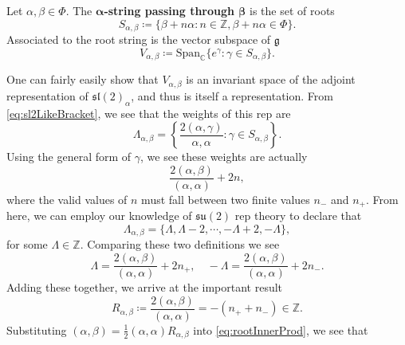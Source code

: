 \documentclass[11pt,fleqn]{article}
\begin{document}
\begin{definition}
	Let $\alpha, \beta \in \Phi$. The \textbf{$\boldsymbol{\alpha}$-string passing through $\boldsymbol{\beta}$} is the set of roots
		\begin{equation}
			S_{\alpha,\beta} \coloneqq \{ \beta + n \alpha: n \in \mathbb{Z}, \beta + n \alpha \in \Phi \}.
		\end{equation}
	Associated to the root string is the vector subspace of $\mathfrak{g}$
		\begin{equation}
			V_{\alpha, \beta} \coloneqq \text{Span}_\mathbb{C} \{e^\gamma : \gamma \in S_{\alpha, \beta} \}.
		\end{equation}
\end{definition}
\begin{remark}
	One can fairly easily show that $V_{\alpha,\beta}$ is an invariant space of the adjoint representation of $\mathfrak{sl}(2)_\alpha$, and thus is itself a representation. From \eqref{eq:sl2LikeBracket}, we see that the weights of this rep are
		\begin{equation}
			\Lambda_{\alpha,\beta} = \left\{ \frac{2 (\alpha, \gamma)}{\alpha, \alpha} : \gamma \in S_{\alpha, \beta} \right\}.
		\end{equation}
	Using the general form of $\gamma$, we see these weights are actually
		\begin{equation}
			\frac{2 (\alpha, \beta)}{(\alpha, \alpha)} + 2n,
		\end{equation}
	where the valid values of $n$ must fall between two finite values $n_-$ and $n_+$. From here, we can employ our knowledge of $\mathfrak{su}(2)$ rep theory to declare that 
		\begin{equation}
			\Lambda_{\alpha,\beta} = \{ \Lambda, \Lambda -2, \cdots, - \Lambda + 2, -\Lambda \},
		\end{equation}
	for some $\Lambda \in \mathbb{Z}$. Comparing these two definitions we see
		\begin{equation}
			\Lambda = \frac{2 (\alpha,\beta)}{(\alpha, \alpha)} + 2n_+, \quad
			-\Lambda= \frac{2 (\alpha,\beta)}{(\alpha, \alpha)} + 2n_-.
		\end{equation}
	Adding these together, we arrive at the important result
		\begin{equation}\label{eq:RootStringLength}
			R_{\alpha,\beta} \coloneqq \frac{2(\alpha,\beta)}{(\alpha,\alpha)} = -(n_+ + n_-) \in \mathbb{Z}.
		\end{equation}
	Substituting $(\alpha,\beta) = \tfrac{1}{2} (\alpha,\alpha) R_{\alpha,\beta}$ into \eqref{eq:rootInnerProd}, we see that

\end{remark}
\end{document}
